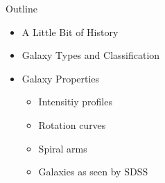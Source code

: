 \documentclass[letterpaper,landscape]{slides}
\begin{document}

\begin{slide}
\begin{center}
{\large \color{red} 
                         Outline
}
\end{center}

\begin{itemize}
\item {\color{blue} A Little Bit of History}
\item {\color{blue} Galaxy Types and Classification}
\item {\color{blue} Galaxy Properties}
\begin{itemize}
\item Intensitiy profiles
\item Rotation curves 
\item Spiral arms 
\item Galaxies as seen by SDSS
\end{itemize}          
\end{itemize}          

\vfill
\end{slide}


\end{document}
